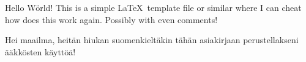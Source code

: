 \documentclass[a4paper,12pt]{artikel1}
\begin{document}
Hello Wörld! This is a simple \LaTeX\ template file or similar where I can
cheat how does this work again. Possibly with even comments!

Hei maailma, heitän hiukan suomenkieltäkin tähän asiakirjaan perustellakseni
ääkkösten käyttöä!

\end{document}
